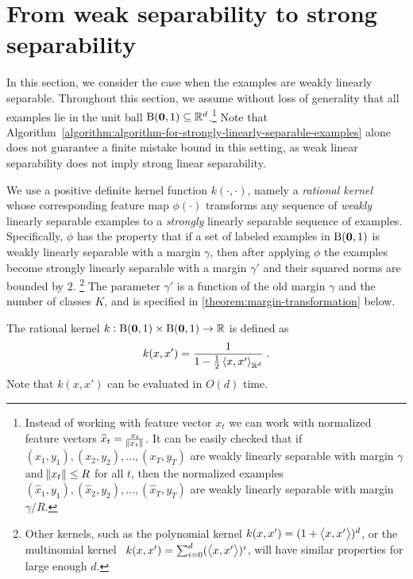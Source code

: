 \section{From weak separability to strong separability}
\label{section:from-weak-separability-to-strong-separability}

In this section, we consider the case when the examples are weakly linearly
separable. Throughout this section, we assume without loss of generality that
all examples lie in the unit ball $\operatorname{B}(\mathbf{0},1) \subseteq \mathbb{R}^d$.\footnote{Instead of
working with feature vector $x_t$ we can work with normalized feature vectors
$\widehat{x}_t = \frac{x_t}{\norm{x_t}}$. It can be easily checked that if
$(x_1,y_1), (x_2,y_2), \dots, (x_T,y_T)$ are weakly linearly separable with
margin $\gamma$ and $\norm{x_t} \le R$ for all $t$, then the normalized examples
$(\widehat{x}_1,y_1), (\widehat{x}_2,y_2), \dots, (\widehat{x}_T,y_T)$ are weakly
linearly separable with margin $\gamma/R$.} Note that
Algorithm~\ref{algorithm:algorithm-for-strongly-linearly-separable-examples}
alone does not guarantee a finite mistake bound in this setting, as weak linear
separability does not imply strong linear separability.

We use a positive definite kernel function $k(\cdot, \cdot)$, namely
a \emph{rational kernel}~\citep{Shalev-Shwartz-Shamir-Sridharan-2011} whose
corresponding feature map $\phi(\cdot)$ transforms any sequence of \emph{weakly}
linearly separable examples to a \emph{strongly} linearly separable sequence of
examples.
Specifically, $\phi$ has the property that if a set of labeled
examples in $\operatorname{B}(\mathbf{0},1)$ is weakly linearly separable with a margin $\gamma$, then
after applying $\phi$ the examples become strongly linearly separable with a
margin $\gamma'$ and their squared norms are bounded by $2$.
\footnote{Other kernels, such as the polynomial kernel
$k(x,x') = (1+\left\langle x, x' \right\rangle)^d$, or the multinomial kernel~\citep{Goel-Klivans-2017} $k(x,x') = \sum_{i=0}^d(\left\langle x, x' \right\rangle)^i$,
will have similar properties for large enough $d$.}
The parameter $\gamma'$ is
a function of the old margin $\gamma$ and the number of classes $K$, and is
specified in \autoref{theorem:margin-transformation} below.

The rational kernel $k:\operatorname{B}(\mathbf{0},1) \times \operatorname{B}(\mathbf{0},1) \to \mathbb{R}$ is defined as
\begin{equation}
\label{equation:rational-kernel}
k(x,x') = \frac{1}{1 - \frac{1}{2}\left\langle x, x' \right\rangle_{\mathbb{R}^d}} \; .
\end{equation}
Note that $k(x,x')$ can be evaluated in $O(d)$ time.

